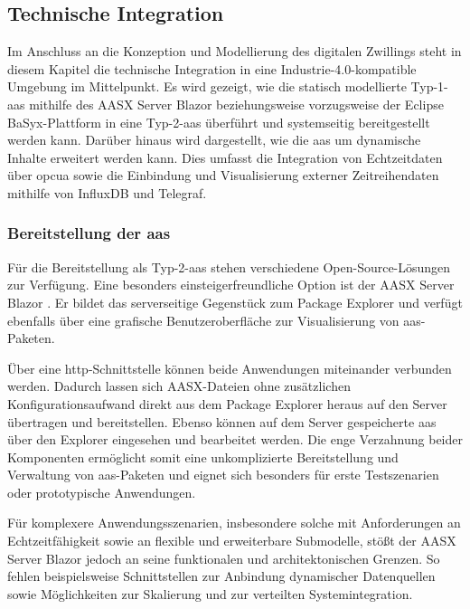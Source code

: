 \subsection{Technische Integration}
Im Anschluss an die Konzeption und Modellierung des digitalen Zwillings steht in diesem Kapitel die technische Integration in eine Industrie-4.0-kompatible Umgebung im Mittelpunkt. 
Es wird gezeigt, wie die statisch modellierte Typ-1-\acs{aas} mithilfe des AASX Server Blazor beziehungsweise vorzugsweise der Eclipse BaSyx-Plattform in eine Typ-2-\acs{aas} überführt und systemseitig bereitgestellt werden kann. 
Darüber hinaus wird dargestellt, wie die \acs{aas} um dynamische Inhalte erweitert werden kann. 
Dies umfasst die Integration von Echtzeitdaten über \acs{opcua} sowie die Einbindung und Visualisierung externer Zeitreihendaten mithilfe von InfluxDB und Telegraf.

\subsubsection{Bereitstellung der \acs{aas}}
\label{sec:bereitstellungAAS}
Für die Bereitstellung als Typ-2-\acs{aas} stehen verschiedene Open-Source-Lösungen zur Verfügung. 
Eine besonders einsteigerfreundliche Option ist der AASX Server Blazor \cite{AASXServer}.
Er bildet das serverseitige Gegenstück zum Package Explorer und verfügt ebenfalls über eine grafische Benutzeroberfläche zur Visualisierung von \acs{aas}-Paketen.

Über eine \acs{http}-Schnittstelle können beide Anwendungen miteinander verbunden werden.
Dadurch lassen sich AASX-Dateien ohne zusätzlichen Konfigurationsaufwand direkt aus dem Package Explorer heraus auf den Server übertragen und bereitstellen.
Ebenso können auf dem Server gespeicherte \acs{aas} über den Explorer eingesehen und bearbeitet werden.
Die enge Verzahnung beider Komponenten ermöglicht somit eine unkomplizierte Bereitstellung und Verwaltung von \acs{aas}-Paketen und eignet sich besonders für erste Testszenarien oder prototypische Anwendungen.

Für komplexere Anwendungsszenarien, insbesondere solche mit Anforderungen an Echtzeitfähigkeit sowie an flexible und erweiterbare Submodelle, stößt der AASX Server Blazor jedoch an seine funktionalen und architektonischen Grenzen. 
So fehlen beispielsweise Schnittstellen zur Anbindung dynamischer Datenquellen sowie Möglichkeiten zur Skalierung und zur verteilten Systemintegration.

\pagebreak

